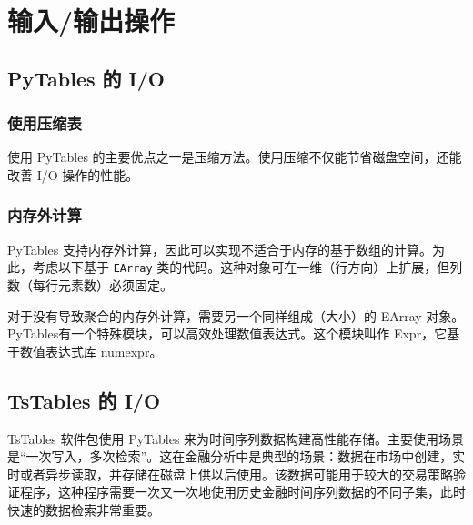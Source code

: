 \chapter{输入/输出操作\label{Ch09}}
\section{PyTables 的 I/O}
\subsection{使用压缩表}
使用 PyTables 的主要优点之一是压缩方法。使用压缩不仅能节省磁盘空间，还能改善 I/O 操作的性能。
\subsection{内存外计算}
PyTables 支持内存外计算，因此可以实现不适合于内存的基于数组的计算。为此，考虑以下基于 \verb|EArray| 类的代码。这种对象可在一维（行方向）上扩展，但列数（每行元素数）必须固定。

对于没有导致聚合的内存外计算，需要另一个同样组成（大小）的 EArray 对象。PyTables有一个特殊模块，可以高效处理数值表达式。这个模块叫作 Expr，它基于数值表达式库 numexpr。

\section{TsTables 的 I/O}
TsTables 软件包使用 PyTables 来为时间序列数据构建高性能存储。主要使用场景是“一次写入，多次检索”。这在金融分析中是典型的场景：数据在市场中创建，实时或者异步读取，并存储在磁盘上供以后使用。该数据可能用于较大的交易策略验证程序，这种程序需要一次又一次地使用历史金融时间序列数据的不同子集，此时快速的数据检索非常重要。